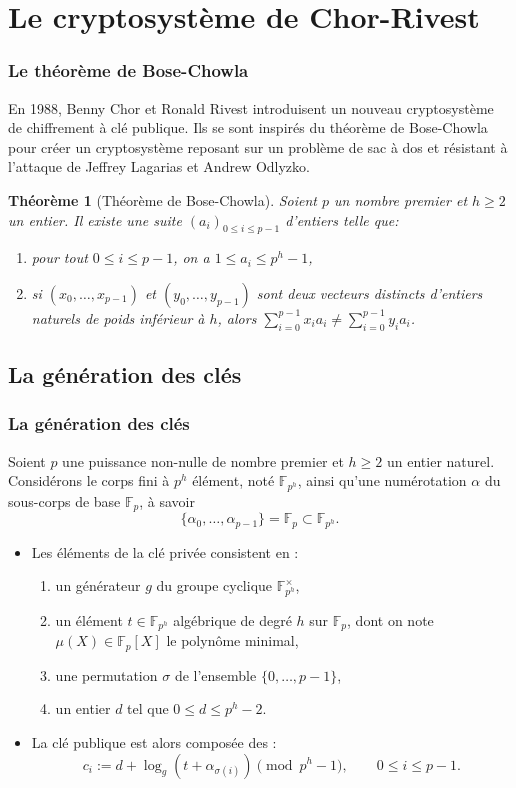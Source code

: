 \documentclass{beamer}
\newtheorem{theo}{Théorème}[section]
\theoremstyle{definition}
\theoremstyle{remark}
\def\gf #1{\mathbb{F}_{#1}}
\begin{document}
\section{Le cryptosystème de Chor-Rivest}
\begin{frame}
	\frametitle{Le théorème de Bose-Chowla}
En 1988, Benny Chor et Ronald Rivest introduisent un nouveau cryptosystème de chiffrement à clé publique. Ils se sont inspirés du théorème de Bose-Chowla pour créer un cryptosystème reposant sur un problème de sac à dos et résistant à l'attaque de Jeffrey Lagarias et Andrew Odlyzko.

\begin{theo}[Théorème de Bose-Chowla]
Soient $p$ un nombre premier et $h \geqslant 2$ un entier. Il existe une suite ${(a_i)}_{0\leqslant i \leqslant p-1}$ d'entiers telle que: \begin{enumerate}
\item pour tout $0 \leqslant i \leqslant p-1$, on a $1 \leqslant a_i \leqslant p^h-1$,
\item si $(x_0, \dots, x_{p-1})$ et $(y_0, \dots, y_{p-1})$ sont deux vecteurs distincts d'entiers naturels de poids inférieur à $h$, alors $\sum_{i=0}^{p-1} x_ia_i \neq \sum_{i=0}^{p-1} y_ia_i$.
\end{enumerate}
\end{theo}
\end{frame}

\subsection{La génération des clés}
\begin{frame}
  \frametitle{La génération des clés}
  Soient $p$ une puissance non-nulle de nombre premier et $h \geqslant 2$ un entier naturel. Considérons le corps fini à $p^h$ élément, noté $\gf{p^h}$, ainsi qu'une numérotation $\alpha$ du sous-corps de base $\gf{p}$, à savoir $$\{\alpha_0,\dots, \alpha_{p-1}\} = \gf{p} \subset \gf{p^h}.$$

  \begin{itemize}
  \item Les éléments de la clé privée consistent en :
    \begin{enumerate}
    \item un générateur $g$ du groupe cyclique $\gf{p^h}^\times$,
    \item un élément $t \in \gf{p^h}$ algébrique de degré $h$ sur $\gf{p}$, dont on note $\mu(X) \in \gf{p}[X]$ le polynôme minimal,
    \item une permutation $\sigma$ de l'ensemble $\{0, \dots, p-1\}$,
    \item un entier $d$ tel que $0 \leqslant d \leqslant p^h-2$.
    \end{enumerate}
  \item La clé publique est alors composée des :
    $$c_i := d + \log_g\left(t + \alpha_{\sigma(i)}\right) \pmod{p^h-1}, \qquad 0 \leqslant i \leqslant p-1.$$
  \end{itemize}
\end{frame}
\end{document}
